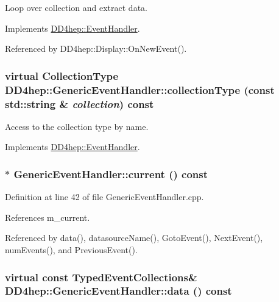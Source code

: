 Loop over collection and extract data. 

Implements \hyperlink{class_d_d4hep_1_1_event_handler_a454baeb81b675f3ebd8bb4293064b787}{DD4hep::EventHandler}.

Referenced by DD4hep::Display::OnNewEvent().\hypertarget{class_d_d4hep_1_1_generic_event_handler_ae0471fce8b637f5825d3dab70537bdcd}{
\subsubsection[{collectionType}]{\setlength{\rightskip}{0pt plus 5cm}virtual {\bf CollectionType} DD4hep::GenericEventHandler::collectionType (const std::string \& {\em collection}) const}}
\label{class_d_d4hep_1_1_generic_event_handler_ae0471fce8b637f5825d3dab70537bdcd}


Access to the collection type by name. 

Implements \hyperlink{class_d_d4hep_1_1_event_handler_a8424ffc2056b0e23d69c81ab2496cd51}{DD4hep::EventHandler}.\hypertarget{class_d_d4hep_1_1_generic_event_handler_a2d8d22b68acdb36e966f20bb5cb4b825}{
\subsubsection[{current}]{ $\ast$ GenericEventHandler::current () const}}
\label{class_d_d4hep_1_1_generic_event_handler_a2d8d22b68acdb36e966f20bb5cb4b825}


Definition at line 42 of file GenericEventHandler.cpp.

References m\_\-current.

Referenced by data(), datasourceName(), GotoEvent(), NextEvent(), numEvents(), and PreviousEvent().\hypertarget{class_d_d4hep_1_1_generic_event_handler_aa1e4452bde1823d4592d4c61f6a62fcc}{
\subsubsection[{data}]{\setlength{\rightskip}{0pt plus 5cm}virtual const {\bf TypedEventCollections}\& DD4hep::GenericEventHandler::data () const}}
\label{class_d_d4hep_1_1_generic_event_handler_aa1e4452bde1823d4592d4c61f6a62fcc}


